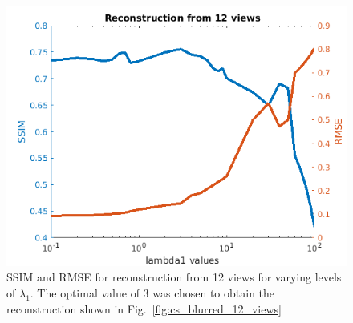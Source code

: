 \documentclass{article}
\begin{document}
\begin{figure}[!h]
\centering
       \includegraphics[width=\columnwidth]{../images/potato/2D/cs_blurred_results/SSIM_RMSE_12_angles.png}
\caption{SSIM and RMSE for reconstruction from 12 views for varying levels of $\lambda_1$. The optimal value of 3 was chosen to obtain the reconstruction shown in Fig.~\ref{fig:cs_blurred_12_views}}
\label{fig:ssim_rmse_12_views}
\end{figure}
\newpage

\end{document}
